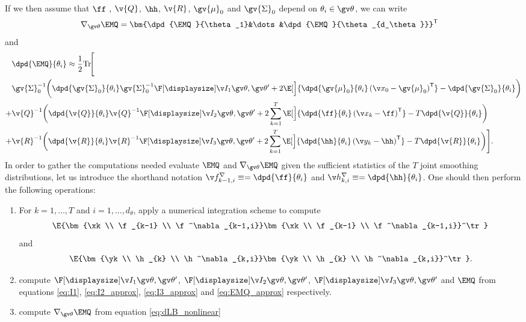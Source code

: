 If we then assume
that $\ff$ , $\v{Q}$, $\hh$, $\v{R}$, $\gv{\mu}_0$ and $\gv{\Sigma}_0$ depend on $\theta_i\in\Th$,
we can write
\begin{align}
	\nabla_{\Th}\EMQ &= \bm{\dpd{\EMQ}{\theta_1}&\dots&\dpd{\EMQ}{\theta_{d_\theta}}}^\tr
\end{align}
and
\begin{align}
\label{eq:dLB_nonlinear}
\begin{split}
	&\dpd{\EMQ}{\theta_i}
	\approx\frac{1}{2}\mathrm{Tr}\!\Bigg[\\
%	
	&\gv{\Sigma}_0^{-1}\bigg(
	\dpd{\gv{\Sigma}_0}{\theta_i}\gv{\Sigma}_0^{-1}
	\II{1}
	+2\E[\Big]{\dpd{\gv{\mu}_0}{\theta_i}\left(\x_0-\gv{\mu}_0\right)^\tr}
	-\dpd{\gv{\Sigma}_0}{\theta_i}\bigg)\\
%	
	+&\v{Q}^{-1}\bigg(\dpd{\v{Q}}{\theta_i}\v{Q}^{-1}
	\II{2}
	+2\sum_{k=1}^T\E[\Big]{\dpd{\ff}{\theta_i}\left(\x_k-\ff\right)^\tr}
	-T\dpd{\v{Q}}{\theta_i}\bigg)\\
%	
	+&\v{R}^{-1}\bigg(\dpd{\v{R}}{\theta_i}\v{R}^{-1}
	\II{3}
	+2\sum_{k=1}^T\E[\Big]{\dpd{\hh}{\theta_i}\left(\y_k-\hh\right)^\tr}
	-T\dpd{\v{R}}{\theta_i}\bigg)\Bigg].
\end{split}	
\end{align}
In order to gather the computations needed evaluate $\EMQ$ and $\nabla_{\Th}\EMQ$ given the sufficient statistics
of the $T$ joint smoothing distributions, let us introduce the shorthand notation $\f^{\nabla}_{k-1,i}\equiv=\dpd{\ff}{\theta_i}$
and  $\h^\nabla_{k,i}\equiv=\dpd{\hh}{\theta_i}$.
One should then
perform the following operations:
\begin{enumerate}
  \item For $k=1,\dots,T$ and $i=1,\dots,d_\theta$, apply a numerical integration scheme to compute
%  
\begin{align}
\E{\bm{\xk \\ \f_{k-1} \\ \f^\nabla_{k-1,i}}\bm{\xk \\ \f_{k-1} \\ \f^\nabla_{k-1,i}}^\tr} 		
\end{align}
and
\begin{align}
\E{\bm{\yk \\ \h_{k} \\ \h^\nabla_{k,i}}\bm{\yk \\ \h_{k} \\ \h^\nabla_{k,i}}^\tr}. 		
\end{align}
\item compute $\II{1}$, $\II{2}$, $\II{3}$ and $\EMQ$ from equations
\eqref{eq:I1}, \eqref{eq:I2_approx}, \eqref{eq:I3_approx} and \eqref{eq:EMQ_approx} respectively.
\item compute $\nabla_{\Th}\EMQ$ from equation \eqref{eq:dLB_nonlinear}
\end{enumerate}
 
